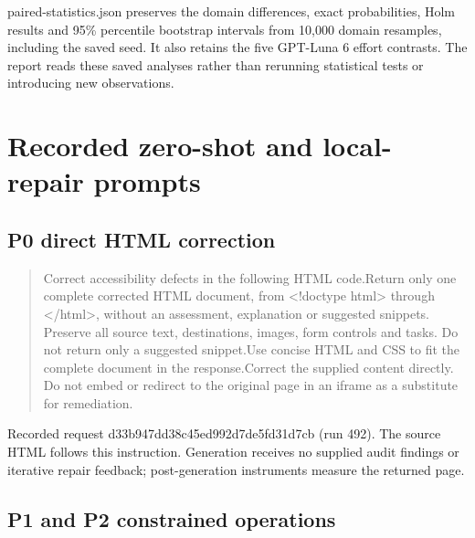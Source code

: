 \documentclass[acmsmall,screen,nonacm]{acmart}
\begin{document}
paired-statistics.json preserves the domain differences, exact probabilities, Holm results and 95\% percentile bootstrap intervals from 10,000 domain resamples, including the saved seed. It also retains the five GPT-Luna 6 effort contrasts. The report reads these saved analyses rather than rerunning statistical tests or introducing new observations.

\clearpage
\section{Recorded zero-shot and local-repair prompts}

\subsection{P0 direct HTML correction}

\begin{quote}\footnotesize\ttfamily\raggedright\sloppy Correct accessibility defects in the following HTML code.\newline Return only one complete corrected HTML document, from <!doctype html> through </html>, without an assessment, explanation or suggested snippets. Preserve all source text, destinations, images, form controls and tasks. Do not return only a suggested snippet.\newline Use concise HTML and CSS to fit the complete document in the response.\newline Correct the supplied content directly. Do not embed or redirect to the original page in an iframe as a substitute for remediation.\end{quote}
Recorded request d33b947dd38c45ed992d7de5fd31d7cb (run 492). The source HTML follows this instruction. Generation receives no supplied audit findings or iterative repair feedback; post-generation instruments measure the returned page.

\subsection{P1 and P2 constrained operations}
\end{document}
